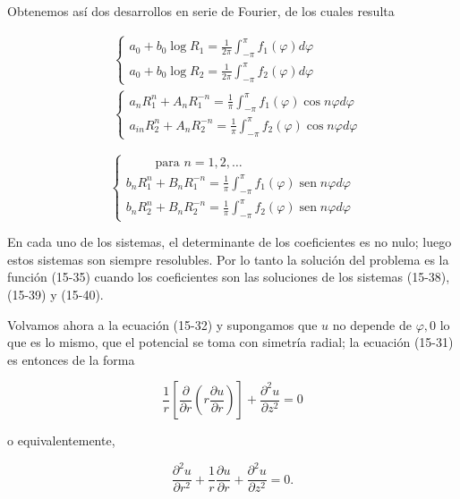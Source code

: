\documentclass[10pt]{article}
\theoremstyle{plain}
\theoremstyle{definition}
\theoremstyle{remark}
\begin{document}
Obtenemos así dos desarrollos en serie de Fourier, de los cuales resulta


\begin{align*}
& \left\{\begin{array}{l}
a_{0}+b_{0} \log R_{1}=\frac{1}{2 \pi} \int_{-\pi}^{\pi} f_{1}(\varphi) d \varphi \\
a_{0}+b_{0} \log R_{2}=\frac{1}{2 \pi} \int_{-\pi}^{\pi} f_{2}(\varphi) d \varphi
\end{array}\right.  \tag{15-38}\\
& \left\{\begin{array}{l}
a_{n} R_{1}^{n}+A_{n} R_{1}^{-n}=\frac{1}{\pi} \int_{-\pi}^{\pi} f_{1}(\varphi) \cos n \varphi d \varphi \\
a_{i n} R_{2}^{n}+A_{n} R_{2}^{-n}=\frac{1}{\pi} \int_{-\pi}^{\pi} f_{2}(\varphi) \cos n \varphi d \varphi
\end{array}\right. \tag{15-39}
\end{align*}



\[
\left\{\begin{array}{l}
\quad \quad \text { para } n=1,2, \ldots \\
b_{n} R_{1}^{n}+B_{n} R_{1}^{-n}=\frac{1}{\pi} \int_{-\pi}^{\pi} f_{1}(\varphi) \operatorname{sen} n \varphi d \varphi  \tag{15-40}\\
b_{n} R_{2}^{n}+B_{n} R_{2}^{-n}=\frac{1}{\pi} \int_{-\pi}^{\pi} f_{2}(\varphi) \operatorname{sen} n \varphi d \varphi
\end{array}\right.
\]

En cada uno de los sistemas, el determinante de los coeficientes es no nulo; luego estos sistemas son siempre resolubles. Por lo tanto la solución del problema es la función (15-35) cuando los coeficientes son las soluciones de los sistemas (15-38), (15-39) y (15-40).

Volvamos ahora a la ecuación (15-32) y supongamos que $u$ no depende de $\varphi, 0$ lo que es lo mismo, que el potencial se toma con simetría radial; la ecuación (15-31) es entonces de la forma

$$
\frac{1}{r}\left[\frac{\partial}{\partial r}\left(r \frac{\partial u}{\partial r}\right)\right]+\frac{\partial^{2} u}{\partial z^{2}}=0
$$

o equivalentemente,


\begin{equation*}
\frac{\partial^{2} u}{\partial r^{2}}+\frac{1}{r} \frac{\partial u}{\partial r}+\frac{\partial^{2} u}{\partial z^{2}}=0 . \tag{15-41}
\end{equation*}
\end{document}
